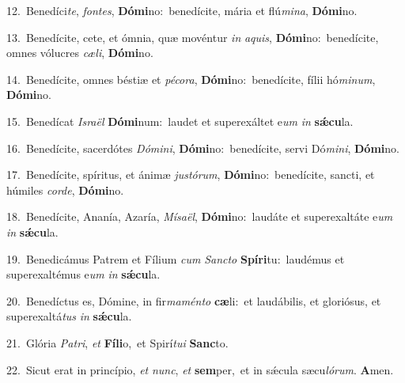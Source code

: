 {\numbfont\textcolor{\numbcolor}{12.}}~Benedíci\-\textit{te}\-, \textit{fon}\-\textit{tes}, \textbf{Dó}\-\textbf{mi}no:~\star benedícite, mária et flú\-\textit{mi}\-\textit{na}, \textbf{Dó}\-\textbf{mi}no.\par
{\numbfont\textcolor{\numbcolor}{13.}}~Benedícite, cete, et ómnia, quæ movéntur \textit{in} \textit{a}\-\textit{quis}, \textbf{Dó}\-\textbf{mi}no:~\star benedícite, omnes vólucres \textit{cæ}\-\textit{li}, \textbf{Dó}\-\textbf{mi}no.\par
{\numbfont\textcolor{\numbcolor}{14.}}~Benedícite, omnes béstiæ et \textit{pé}\-\textit{co}\textit{ra}, \textbf{Dó}\-\textbf{mi}no:~\star benedícite, fílii hó\-\textit{mi}\-\textit{num}, \textbf{Dó}\-\textbf{mi}no.\par
{\numbfont\textcolor{\numbcolor}{15.}}~Benedícat \textit{Is}\-\textit{ra}\textit{ël} \textbf{Dó}\-\textbf{mi}num:~\star laudet et superexáltet e\textit{um} \textit{in} \textbf{sǽ}\-\textbf{cu}la.\par
{\numbfont\textcolor{\numbcolor}{16.}}~Benedícite, sacerdótes \textit{Dó}\-\textit{mi}\textit{ni}, \textbf{Dó}\-\textbf{mi}no:~\star benedícite, servi Dó\-\textit{mi}\-\textit{ni}, \textbf{Dó}\-\textbf{mi}no.\par
{\numbfont\textcolor{\numbcolor}{17.}}~Benedícite, spíritus, et ánimæ \textit{jus}\-\textit{tó}\textit{rum}, \textbf{Dó}\-\textbf{mi}no:~\star benedícite, sancti, et húmiles \textit{cor}\-\textit{de}, \textbf{Dó}\-\textbf{mi}no.\par
{\numbfont\textcolor{\numbcolor}{18.}}~Benedícite, Ananía, Azaría, \textit{Mí}\-\textit{sa}\textit{ël}, \textbf{Dó}\-\textbf{mi}no:~\star laudáte et superexaltáte e\textit{um} \textit{in} \textbf{sǽ}\-\textbf{cu}la.\par
{\numbfont\textcolor{\numbcolor}{19.}}~Benedicámus Patrem et Fílium \textit{cum} \textit{Sanc}\-\textit{to} \textbf{Spí}\-\textbf{ri}tu:~\star laudémus et superexaltémus e\textit{um} \textit{in} \textbf{sǽ}\-\textbf{cu}la.\par
{\numbfont\textcolor{\numbcolor}{20.}}~Benedíctus es, Dómine, in fir\-\textit{ma}\-\textit{mén}\textit{to} \textbf{cæ}\-li:~\star et laudábilis, et gloriósus, et superexaltá\textit{tus} \textit{in} \textbf{sǽ}\-\textbf{cu}la.\par
{\numbfont\textcolor{\numbcolor}{21.}}~Glória \textit{Pa}\-\textit{tri}, \textit{et} \textbf{Fí}\-\textbf{li}o,~\star et Spirí\-\textit{tu}\-\textit{i} \textbf{Sanc}\-to.\par
{\numbfont\textcolor{\numbcolor}{22.}}~Sicut erat in princípio, \textit{et} \textit{nunc}\-, \textit{et} \textbf{sem}\-per,~\star et in sǽcula sæcu\-\textit{ló}\-\textit{rum}. \textbf{A}\-men.\par
